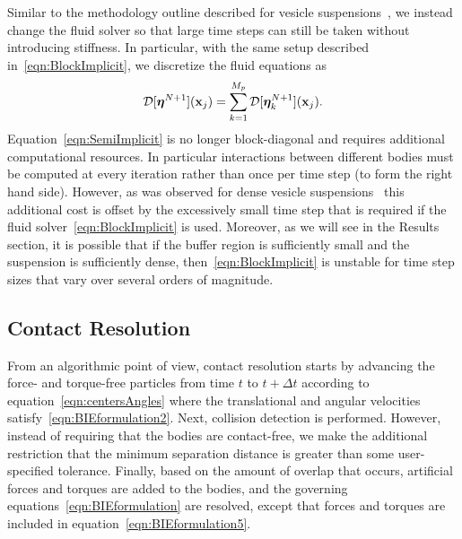 \documentclass[preprint, 10pt]{elsarticle}
\begin{document}
Similar to the methodology
outline described for vesicle suspensions~\cite{Quaife2014}, we instead
change the fluid solver so that large time steps can still be taken
without introducing stiffness.  In particular, with the same setup
described in~\eqref{eqn:BlockImplicit}, we discretize the fluid
equations as
\begin{align}
  {\mathcal{D}}[{\boldsymbol\eta}^{N+1}]({\mathbf{x}}_j) = 
  \sum_{k=1}^{M_p} {\mathcal{D}}[{\boldsymbol\eta}^{N+1}_k]({\mathbf{x}}_j).
  \label{eqn:SemiImplicit}
\end{align}
Equation~\eqref{eqn:SemiImplicit} is no longer block-diagonal and requires additional computational
resources. In particular
interactions between different bodies must be computed at every
iteration rather than once per time step (to form the right hand side).
However, as was observed for dense vesicle suspensions~\cite{Quaife2014, Rahimian2015} this
additional cost is offset by the
excessively small time step that is required if the fluid
solver~\eqref{eqn:BlockImplicit} is used.  Moreover, as we will see in
the Results section, it is possible that if the buffer region is
sufficiently small and the suspension is sufficiently dense,
then~\eqref{eqn:BlockImplicit} is unstable for time step sizes that vary
over several orders of magnitude.

\subsection{Contact Resolution}

From an algorithmic point of view, contact resolution starts by
advancing the force- and torque-free particles from time $t$ to $t +
\Delta t$ according to equation~\eqref{eqn:centersAngles} where the
translational and angular velocities satisfy~\eqref{eqn:BIEformulation2}.
Next, collision detection is performed.  However, instead of requiring
that the bodies are contact-free, we make the additional restriction
that the minimum separation distance is greater than some user-specified
tolerance.  Finally, based on the amount of overlap that occurs,
artificial forces and torques are added to the bodies, and the governing
equations~\eqref{eqn:BIEformulation} are resolved, except that forces
and torques are included in equation~\eqref{eqn:BIEformulation5}.  

\end{document}
